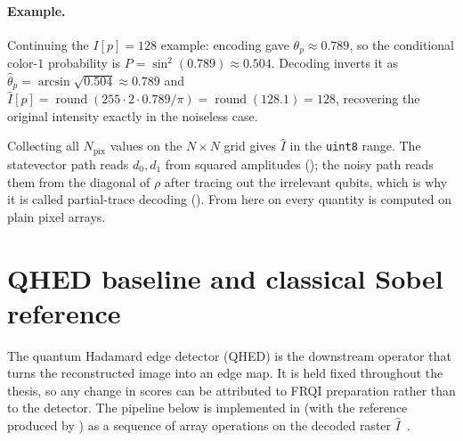 \paragraph{Example.}
Continuing the $I[p]=128$ example: encoding gave $\theta_p\approx 0.789$, so the conditional color-$1$ probability is $P=\sin^2(0.789)\approx 0.504$. Decoding inverts it as $\hat{\theta}_p=\arcsin\sqrt{0.504}\approx 0.789$ and $\hat{I}[p]=\operatorname{round}(255\cdot 2\cdot 0.789/\pi)=\operatorname{round}(128.1)=128$, recovering the original intensity exactly in the noiseless case.

Collecting all $N_{\mathrm{pix}}$ values on the $N\times N$ grid gives $\hat{I}$ in the \texttt{uint8} range. The statevector path reads $d_0,d_1$ from squared amplitudes (); the noisy path reads them from the diagonal of $\rho$ after tracing out the irrelevant qubits, which is why it is called partial-trace decoding (). From here on every quantity is computed on plain pixel arrays.

\section{QHED baseline and classical Sobel reference}
The quantum Hadamard edge detector (QHED) is the downstream operator that turns the reconstructed image into an edge map. It is held fixed throughout the thesis, so any change in scores can be attributed to FRQI preparation rather than to the detector. The pipeline below is implemented in  (with the reference produced by ) as a sequence of array operations on the decoded raster $\hat{I}$~\cite{Yao2017QHED,QiskitTextbookQuantumEdgeDetection}.

